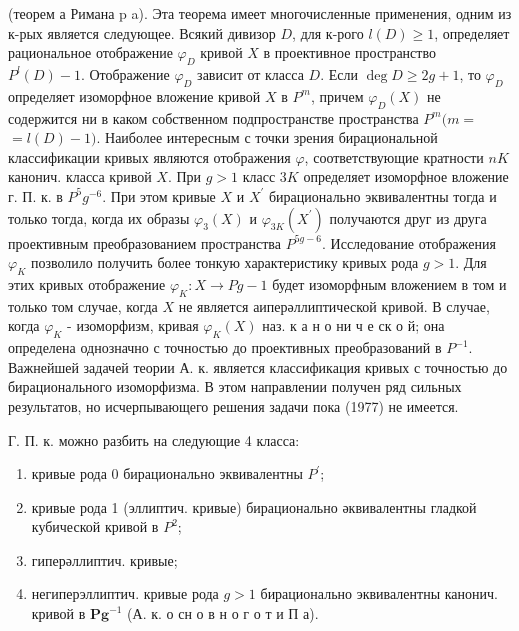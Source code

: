 \documentclass[10pt]{article}
\begin{document}
(теорем а Римана p a). Эта теорема имеет многочисленные применения, одним из к-рых является следующее. Всякий дивизор $D$, для к-рого $l(D) \geqslant 1$, определяет рациональное отображение $\varphi_{D}$ кривой $X$ в проективное пространство $P^{l}(D)-1$. Отображение $\varphi_{D}$ зависит от класса $D$. Если $\operatorname{deg} D \geqslant 2 g+1$, то $\varphi_{D}$ определяет изоморфное вложение кривой $X$ в $P^{m}$, причем $\varphi_{D}(X)$ не содержится ни в каком собственном подпространстве пространства $P^{m}(m=$ $=l(D)-1)$. Наиболее интересным с точки зрения бирациональной классификации кривых являются отображения $\varphi$, соответствующие кратности $n K$ канонич. класса кривой $X$. При $g>1$ класс $3 K$ определяет изоморфное вложение г. П. к. в $P^{5} g^{-6}$. При этом кривые $X$ и $X^{\prime}$ бирационально эквивалентны тогда и только тогда, когда их образы $\varphi_{3}(X)$ и $\varphi_{3 K}\left(X^{\prime}\right)$ получаются друг из друга проективным преобразованием пространства $P^{5 g-6}$. Исследование отображения $\varphi_{K}$ позволило получить более тонкую характеристику кривых рода $g>1$. Для этих кривых отображение $\varphi_{K}: X \rightarrow P g-1$ будет изоморфным вложением в том и только том случае, когда $X$ не является аиперәллиптической кривой. В случае, когда $\varphi_{K}$ - изоморфизм, кривая $\varphi_{K}(X)$ наз. к а н о ни ч е ск о й; она определена однозначно с точностью до проективных преобразований в $P^{-1}$. Важнейшей задачей теории А. к. является классификация кривых с точностью до бирационального изоморфизма. В этом направлении получен ряд сильных результатов, но исчерпывающего решения задачи пока (1977) не имеется.



Г. П. к. можно разбить на следующие 4 класса:



\begin{enumerate}

  \item кривые рода 0 бирационально эквивалентны $P^{\prime}$;



  \item кривые рода 1 (эллиптич. кривые) бирационально әквивалентны гладкой кубической кривой в $P^{2}$;



  \item гиперәллиптич. кривые;



  \item негиперэллиптич. кривые рода $g>1$ бирационально эквивалентны канонич. кривой в $\boldsymbol{P g}^{-1}$ (А. к. о сн о в н о г о т и П а).



\end{enumerate}
\end{document}

